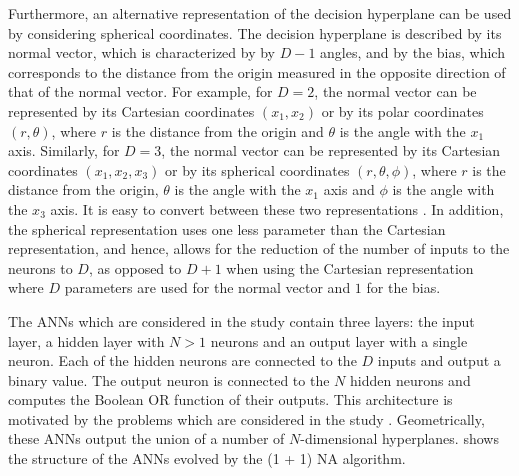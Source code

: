 Furthermore, an alternative representation of the decision hyperplane can be used by considering spherical coordinates.
The decision hyperplane is described by its normal vector, which is characterized by by $D - 1$ angles, and by the bias, which corresponds to the distance from the origin
measured in the opposite direction of that of the normal vector.
For example, for $D = 2$, the normal vector can be represented by its Cartesian coordinates $(x_1, x_2)$ or by its polar coordinates
$(r, \theta)$, where $r$ is the distance from the origin and $\theta$ is the angle with the $x_1$ axis. Similarly, for $D = 3$, the normal vector can
be represented by its Cartesian coordinates $(x_1, x_2, x_3)$ or by its spherical coordinates $(r, \theta, \phi)$, where $r$ is the distance from the
origin, $\theta$ is the angle with the $x_1$ axis and $\phi$ is the angle with the $x_3$ axis.
It is easy to convert between these two representations \cite{spherical}. In addition, the spherical representation uses one less parameter than the Cartesian
representation, and hence, allows for the reduction of the number of inputs to the neurons to $D$, as opposed to $D + 1$ when using the Cartesian representation
where $D$ parameters are used for the normal vector and $1$ for the bias.

The ANNs which are considered in the study contain three layers: the input layer, a hidden layer with $N > 1$ neurons and an output layer with a single neuron.
Each of the hidden neurons are connected to the $D$ inputs and output a binary value. The output neuron is connected to the $N$ hidden neurons and
computes the Boolean OR function of their outputs.
This architecture is motivated by the problems which are considered in the study \cite{na}.
Geometrically, these ANNs output the union of a number of $N$-dimensional hyperplanes.
 shows the structure of the ANNs evolved by the (1 + 1) NA algorithm.

